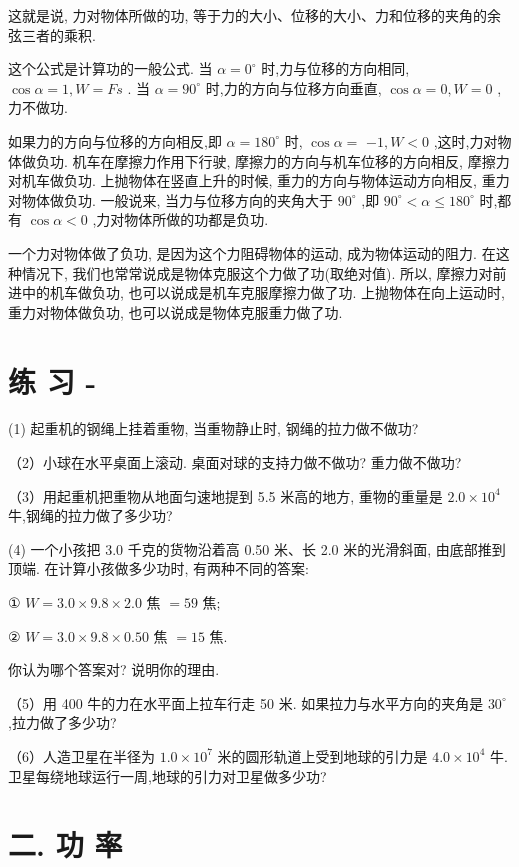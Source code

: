 \documentclass[10pt]{article}
\begin{document}
这就是说, 力对物体所做的功, 等于力的大小、位移的大小、力和位移的夹角的余弦三者的乘积.

这个公式是计算功的一般公式. 当 \(\alpha = {0}^{ \circ }\) 时,力与位移的方向相同, \(\cos \alpha = 1,W = {Fs}\) . 当 \(\alpha = {90}^{ \circ }\) 时,力的方向与位移方向垂直, \(\cos \alpha = 0,W = 0\) ,力不做功.

如果力的方向与位移的方向相反,即 \(\alpha = {180}^{ \circ }\) 时, \(\cos \alpha =\) \(- 1,W < 0\) ,这时,力对物体做负功. 机车在摩擦力作用下行驶, 摩擦力的方向与机车位移的方向相反, 摩擦力对机车做负功. 上抛物体在竖直上升的时候, 重力的方向与物体运动方向相反, 重力对物体做负功. 一般说来, 当力与位移方向的夹角大于 \({90}^{ \circ }\) ,即 \({90}^{ \circ } < \alpha \leq {180}^{ \circ }\) 时,都有 \(\cos \alpha < 0\) ,力对物体所做的功都是负功.

一个力对物体做了负功, 是因为这个力阻碍物体的运动, 成为物体运动的阻力. 在这种情况下, 我们也常常说成是物体克服这个力做了功(取绝对值). 所以, 摩擦力对前进中的机车做负功, 也可以说成是机车克服摩擦力做了功. 上抛物体在向上运动时, 重力对物体做负功, 也可以说成是物体克服重力做了功.

\section*{练 习 -}

(1) 起重机的钢绳上挂着重物, 当重物静止时, 钢绳的拉力做不做功?

（2）小球在水平桌面上滚动. 桌面对球的支持力做不做功? 重力做不做功?

（3）用起重机把重物从地面匀速地提到 5.5 米高的地方, 重物的重量是 \({2.0} \times {10}^{4}\) 牛,钢绳的拉力做了多少功?

(4) 一个小孩把 3.0 千克的货物沿着高 0.50 米、长 2.0 米的光滑斜面, 由底部推到顶端. 在计算小孩做多少功时, 有两种不同的答案:

① \(W = {3.0} \times {9.8} \times {2.0}\) 焦 \(= {59}\) 焦;

② \(W = {3.0} \times {9.8} \times {0.50}\) 焦 \(= {15}\) 焦.

你认为哪个答案对? 说明你的理由.

（5）用 400 牛的力在水平面上拉车行走 50 米. 如果拉力与水平方向的夹角是 \({30}^{ \circ }\) ,拉力做了多少功?

（6）人造卫星在半径为 \({1.0} \times {10}^{7}\) 米的圆形轨道上受到地球的引力是 \({4.0} \times {10}^{4}\) 牛. 卫星每绕地球运行一周,地球的引力对卫星做多少功?

\section*{二. 功 率}
\end{document}
